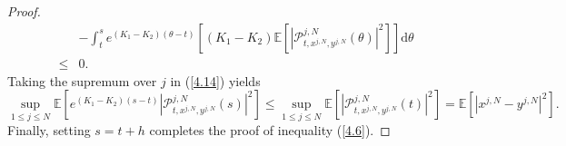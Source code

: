 \documentclass[10pt,a4paper]{amsart}
\begin{document}
\begin{proof}
\begin{equation}
\begin{aligned}
&-\int_t^s  e^{\left(K_1-K_2\right)\left(\theta-t\right)}\left[\left(K_1-K_2\right)\mathbb{E}\left[\left|\mathcal{P}^{j,N}_{t, x^{j,N}, y^{j,N}}\left(\theta\right)\right|^{2}\right]\right]\mathrm{d} \theta\\
\leq&0.
\end{aligned}
\end{equation}
Taking the supremum over $ j $ in (\ref{4.14}) yields
\begin{equation}\tag{5.32}\label{4.15}
\underset{1\leqslant j\leqslant N}{\sup}\mathbb{E}\left[e^{\left(K_1-K_2\right)\left(s-t\right)}\left|\mathcal{P}^{j,N}_{t, x^{j,N}, y^{j,N}}\left(s\right)\right|^{2}\right] \leq \underset{1\leqslant j\leqslant N}{\sup}\mathbb{E}\left[\left|\mathcal{P}^{j,N}_{t, x^{j,N}, y^{j,N}}\left(t\right)\right|^{2}\right]=\mathbb{E}\left[\left|x^{j,N}-y^{j,N}\right|^{2}\right].
\end{equation}
Finally, setting $s=t+h$ completes the proof of inequality (\ref{4.6}).
 

\end{proof}
\end{document}
